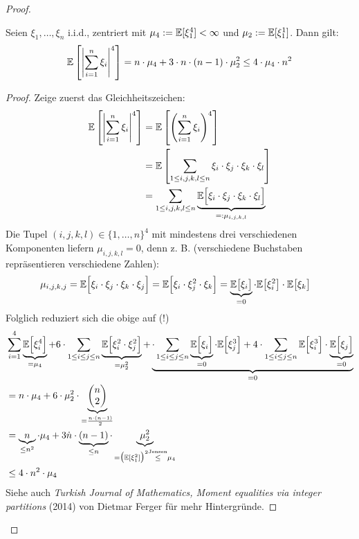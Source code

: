 \begin{proof}
	\begin{lem}\enter
	Seien $\xi_1,\ldots,\xi_n$ i.i.d., zentriert mit $\mu_4:=\mathbb{E}[\xi_1^4]<\infty$ und $\mu_2:=\mathbb{E}[\xi_1^1]$. Dann gilt:
		\begin{align*}
			\mathbb{E}\left[\left|\sum\limits_{i=1}^n\xi_i\right|^4\right]=n\cdot\mu_4+3\cdot n\cdot(n-1)\cdot\mu_2^2
			\leq 4\cdot\mu_4\cdot n^2
		\end{align*}
	\end{lem}

	\begin{proof}
		Zeige zuerst das Gleichheitszeichen:
		\begin{align*}
			\mathbb{E}\left[\left|\sum\limits_{i=1}^n\xi_i\right|^4\right]
			&=\mathbb{E}\left[\left(\sum\limits_{i=1}^n\xi_i\right)^4\right]\\
			&=\mathbb{E}\left[\sum\limits_{1\leq i,j,k,l\leq n}\xi_i\cdot\xi_j\cdot\xi_k\cdot\xi_l\right]\\
			&=\sum\limits_{1\leq i,j,k,l\leq n}\underbrace{\mathbb{E}\Big[\xi_i\cdot\xi_j\cdot\xi_k\cdot\xi_l\Big]}_{=:\mu_{i,j,k,l}}
		\end{align*}
		Die Tupel $(i,j,k,l)\in\lbrace1,\ldots,n\rbrace^4$ mit mindestens drei verschiedenen Komponenten liefern $\mu_{i,j,k,l}=0$, 
		denn z. B. (verschiedene Buchstaben repräsentieren verschiedene Zahlen):
		\begin{align*}
			\mu_{i,j,k,j}
			&=\mathbb{E}\Big[\xi_i\cdot\xi_j\cdot\xi_k\cdot\xi_j\Big]
			=\mathbb{E}\Big[\xi_i\cdot\xi_j^2\cdot\xi_k\Big]=\underbrace{\mathbb{E}\big[\xi_i\big]}_{=0}\cdot\mathbb{E}\big[\xi_i^2\big]\cdot\mathbb{E}\big[\xi_k\big]
		\end{align*}
		Folglich reduziert sich die obige auf (!)
		\begin{align*}
			&\sum\limits_{i=1}^4\underbrace{\mathbb{E}\Big[\xi_i^4\Big]}_{=\mu_4}
			+6\cdot\sum\limits_{1\leq i\leq j\leq n}
			\underbrace{\mathbb{E}\Big[\xi_i^2\cdot\xi_j^2\Big]}_{=\mu_2^2}
			+\underbrace{\cdot\sum\limits_{1\leq i\leq j\leq n}\underbrace{\mathbb{E}\Big[\xi_i\Big]}_{=0}\cdot\mathbb{E}\Big[\xi_j^3\Big]+4\cdot\sum\limits_{1\leq i\leq j\leq n}\mathbb{E}\Big[\xi_i^3\Big]\cdot\underbrace{\mathbb{E}\Big[\xi_j\Big]}_{=0}}_{=0}\\
			&=n\cdot\mu_4+6\cdot\mu_2^2\cdot\underbrace{\begin{pmatrix}
			n\\ 2
			\end{pmatrix}}_{=\frac{n\cdot(n-1)}{2}}\\
			&=\underbrace{n}_{\leq n^2}\cdot\mu_4+3\dot n\cdot\underbrace{(n-1)}_{\leq n}\cdot\underbrace{\mu_2^2}_{=\big(\mathbb{E}[\xi_1^2]\big)^2\stackrel{\text{Jensen}}{\leq}\mu_4}\\
			&\leq 4\cdot n^2\cdot\mu_4
		\end{align*}
		Siehe auch \textit{Turkish Journal of Mathematics, Moment equalities via integer partitions} (2014) von Dietmar Ferger für mehr Hintergründe.
	\end{proof}


\end{proof}
